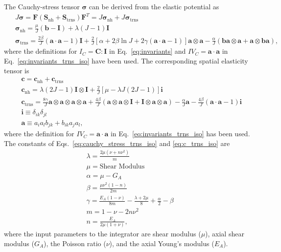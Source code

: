 The Cauchy-stress tensor $\pmb{\sigma}$ can be derived from the elastic potential as
%
\begin{align}
&J\pmb{\sigma} = \pmb{F} \left(\pmb{S}_{\text{nh}} + \pmb{S}_{\text{trns}}\right)\pmb{F}^T = J\pmb{\sigma}_{\text{nh}} +J\pmb{\sigma}_{\text{trns}} \nonumber\\ \ \
%
&\pmb{\sigma}_{\text{nh}} = \frac{\mu}{J}\left(\pmb{b} - \pmb{I}\right) + \lambda \left(J - 1\right) \pmb{I} \nonumber\\ \ \
%
&\pmb{\sigma}_{\text{trns}} = \frac{2\beta}{J}\left(\pmb{a}\cdot\pmb{a} -1\right)\pmb{I} + \frac{2}{J}\left[\alpha + 2\beta \ln J + 2\gamma(\pmb{a}\cdot\pmb{a}-1) \right] \pmb{a} \otimes \pmb{a} - \frac{\alpha}{J}(\pmb{b}\pmb{a}\otimes\pmb{a} + \pmb{a} \otimes \pmb{b} \pmb{a}),
\label{eq:cauchy_stress_trns_iso}
\end{align}
%
where the definitions for $I_C=\pmb{C}:\pmb{I}$ in Eq.\ \eqref{eq:invariants} and $IV_C=\pmb{a}\cdot\pmb{a}$ in Eq.\ \eqref{eq:invariants_trns_iso} have been used. The corresponding spatial elasticity tensor is
\begin{align}
&\pmb{c} = \pmb{c}_{\text{nh}} + \pmb{c}_{\text{trns}} \nonumber\\
%
&\pmb{c}_{\text{nh}} = \lambda(2J-1)\pmb{I} \otimes \pmb{I}+\frac{2}{J}\left[\mu - \lambda J(2J-1)\right]\pmb{i} \nonumber\\ \ \
%
&\pmb{c}_{\text{trns}} = \frac{8\gamma}{J}\pmb{a} \otimes \pmb{a} \otimes \pmb{a} \otimes \pmb{a} + \frac{4\beta}{J}\left(\pmb{a}\otimes\pmb{a}\otimes\pmb{I}+\pmb{I}\otimes\pmb{a}\otimes\pmb{a} \right) - \frac{\alpha}{J} \textbf{a} - \frac{4\beta}{J}(\pmb{a}\cdot\pmb{a}-1)\pmb{i} \nonumber\\ \ \
%
&\pmb{i} \equiv \delta_{ik}\delta_{jl} \nonumber\\
%
&\textbf{a} \equiv a_i a_l b_{jk} + b_{ik} a_j a_l,
\label{eq:c_trns_iso}
\end{align}
%
where the definition for $IV_C=\pmb{a}\cdot\pmb{a}$ in Eq.\ \eqref{eq:invariants_trns_iso} has been used. The constants of Eqs.\ \eqref{eq:cauchy_stress_trns_iso} and \eqref{eq:c_trns_iso} are \cite{Bonet:1998vc}
%
\begin{align}
&\lambda = \frac{2\mu (\nu+n\nu^2)}{m} \nonumber\\ 
%
&\mu = \text{Shear Modulus} \nonumber\\
%
&\alpha = \mu - G_A \nonumber\\
%
&\beta = \frac{\mu \nu^2(1-n)}{2m} \nonumber\\ 
%
&\gamma = \frac{E_A(1-\nu)}{8m} - \frac{\lambda+2\mu}{8} + \frac{\alpha}{2} - \beta \nonumber\\
%
&m = 1 - \nu - 2 n\nu^2 \nonumber\\
%
&n = \frac{E_A}{2\mu(1+\nu)},
\label{eq:trns_iso_constants}
\end{align}
%
where the input parameters to the integrator are shear modulus ($\mu$), axial shear modulus ($G_A$), the Poisson ratio ($\nu$), and the axial Young's modulus ($E_A$).  

